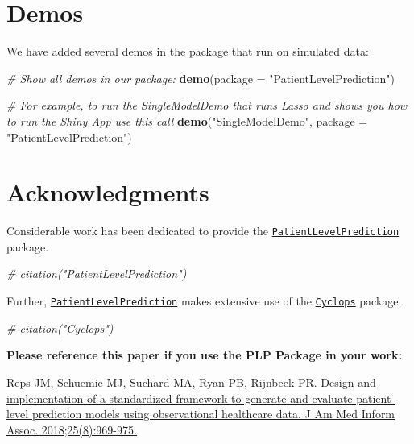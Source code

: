 \documentclass[]{book}
\newenvironment{Shaded}{\begin{snugshade}}{\end{snugshade}}
\newcommand{\KeywordTok}[1]{\textcolor[rgb]{0.13,0.29,0.53}{\textbf{#1}}}
\newcommand{\DataTypeTok}[1]{\textcolor[rgb]{0.13,0.29,0.53}{#1}}
\newcommand{\StringTok}[1]{\textcolor[rgb]{0.31,0.60,0.02}{#1}}
\newcommand{\CommentTok}[1]{\textcolor[rgb]{0.56,0.35,0.01}{\textit{#1}}}
\newcommand{\NormalTok}[1]{#1}
\begin{document}
\section{Demos}\label{demos}

We have added several demos in the package that run on simulated data:

\begin{Shaded}
\begin{Highlighting}[]
\CommentTok{# Show all demos in our package:}
 \KeywordTok{demo}\NormalTok{(}\DataTypeTok{package =} \StringTok{"PatientLevelPrediction"}\NormalTok{)}

\CommentTok{# For example, to run the SingleModelDemo that runs Lasso and shows you how to run the Shiny App use this call}
 \KeywordTok{demo}\NormalTok{(}\StringTok{"SingleModelDemo"}\NormalTok{, }\DataTypeTok{package =} \StringTok{"PatientLevelPrediction"}\NormalTok{)}
\end{Highlighting}
\end{Shaded}

\newpage

\section{Acknowledgments}\label{acknowledgments}

Considerable work has been dedicated to provide the
\href{http://github.com/OHDSI/PatientLevelPrediction}{\texttt{PatientLevelPrediction}}
package.

\begin{Shaded}
\begin{Highlighting}[]
\CommentTok{# citation("PatientLevelPrediction")}
\end{Highlighting}
\end{Shaded}

Further,
\href{http://github.com/OHDSI/PatientLevelPrediction}{\texttt{PatientLevelPrediction}}
makes extensive use of the
\href{http://github.com/OHDSI/Cyclops}{\texttt{Cyclops}} package.

\begin{Shaded}
\begin{Highlighting}[]
\CommentTok{# citation("Cyclops")}
\end{Highlighting}
\end{Shaded}

\textbf{Please reference this paper if you use the PLP Package in your
work:}

\href{http://dx.doi.org/10.1093/jamia/ocy032}{Reps JM, Schuemie MJ,
Suchard MA, Ryan PB, Rijnbeek PR. Design and implementation of a
standardized framework to generate and evaluate patient-level prediction
models using observational healthcare data. J Am Med Inform Assoc.
2018;25(8):969-975.}
\end{document}
